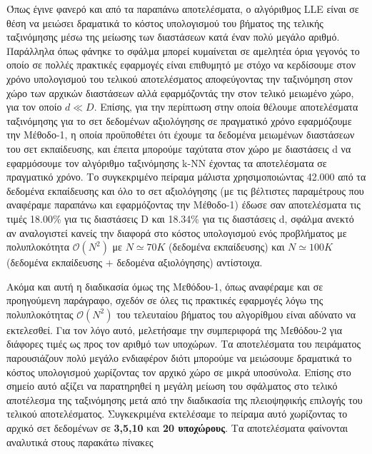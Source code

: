 \par
Όπως έγινε φανερό και από τα παραπάνω αποτελέσματα, ο αλγόριθμος \textlatin{LLE} είναι σε θέση να μειώσει δραματικά το κόστος υπολογισμού του βήματος της τελικής ταξινόμησης μέσω της μείωσης των διαστάσεων κατά έναν πολύ μεγάλο αριθμό. Παράλληλα όπως φάνηκε το σφάλμα μπορεί κυμαίνεται σε αμελητέα όρια γεγονός το οποίο σε πολλές πρακτικές εφαρμογές είναι επιθυμητό με στόχο να κερδίσουμε στον χρόνο υπολογισμού του τελικού αποτελέσματος αποφεύγοντας την ταξινόμηση στον χώρο των αρχικών διαστάσεων αλλά εφαρμόζοντάς την στον τελικό μειωμένο χώρο, για τον οποίο $d \ll D$. Επίσης, για την περίπτωση στην οποία θέλουμε αποτελέσματα ταξινόμησης για το σετ δεδομένων αξιολόγησης σε πραγματικό χρόνο εφαρμόζουμε την Μέθοδο-1, η οποία προϋποθέτει ότι έχουμε τα δεδομένα μειωμένων διαστάσεων του σετ εκπαίδευσης, και έπειτα μπορούμε ταχύτατα στον χώρο με διαστάσεις \textlatin{d} να εφαρμόσουμε τον αλγόριθμο ταξινόμησης \textlatin{k-NN} έχοντας τα αποτελέσματα σε πραγματικό χρόνο. Το συγκεκριμένο πείραμα μάλιστα χρησιμοποιώντας 42.000 από τα δεδομένα εκπαίδευσης και όλο το σετ αξιολόγησης (με τις βέλτιστες παραμέτρους που αναφέραμε παραπάνω και εφαρμόζοντας την Μέθοδο-1) έδωσε σαν αποτελέσματα τις τιμές 18.00\% για τις διαστάσεις \textlatin{D} και 18.34\% για τις διαστάσεις \textlatin{d}, σφάλμα ανεκτό αν αναλογιστεί κανείς την διαφορά στο κόστος υπολογισμού ενός προβλήματος με πολυπλοκότητα $ \mathcal{O}(N^2)$ με $N \simeq 70K$ (δεδομένα εκπαίδευσης) και $N \simeq 100K$ (δεδομένα εκπαίδευσης $+$ δεδομένα αξιολόγησης) αντίστοιχα.
\par
Ακόμα και αυτή η διαδικασία όμως της Μεθόδου-1, όπως αναφέραμε και σε προηγούμενη παράγραφο, σχεδόν σε όλες τις πρακτικές εφαρμογές λόγω της πολυπλοκότητας $ \mathcal{O}(N^2)$  του τελευταίου βήματος του αλγορίθμου είναι αδύνατο να εκτελεσθεί. Για τον λόγο αυτό, μελετήσαμε την συμπεριφορά της Μεθόδου-2 για διάφορες τιμές ως προς τον αριθμό των υποχώρων. Τα αποτελέσματα του πειράματος παρουσιάζουν πολύ μεγάλο ενδιαφέρον διότι μπορούμε να μειώσουμε δραματικά το κόστος υπολογισμού χωρίζοντας τον αρχικό χώρο σε μικρά υποσύνολα. Επίσης στο σημείο αυτό αξίζει να παρατηρηθεί η μεγάλη μείωση του σφάλματος στο τελικό αποτέλεσμα της ταξινόμησης μετά από την διαδικασία της πλειοψηφικής επιλογής του τελικού αποτελέσματος. Συγκεκριμένα εκτελέσαμε το πείραμα αυτό χωρίζοντας το αρχικό σετ δεδομένων σε \textbf{3,5,10} και \textbf{20 υποχώρους}. Τα αποτελέσματα φαίνονται αναλυτικά στους παρακάτω πίνακες

